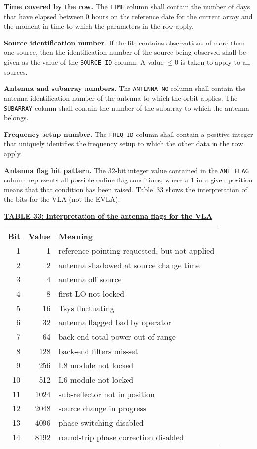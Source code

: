 \documentclass[twoside]{article}
\begin{document}
{\bf Time covered by the row.}  The {\tt TIME} column shall contain
the number of days that have elapsed between 0 hours on the reference
date for the current array and the moment in time to which the
parameters in the row apply.

{\bf Source identification number.} If the file contains observations
of more than one source, then the identification number of the source
being observed shall be given as the value of the {\tt SOURCE ID}
column.  A value $\leq 0$ is taken to apply to all sources.

{\bf Antenna and subarray numbers.}  The {\tt ANTENNA\_NO} column
shall contain the antenna identification number of the antenna to
which the orbit applies.  The {\tt SUBARRAY} column shall contain the
number of the subarray to which the antenna belongs.

{\bf Frequency setup number.} The {\tt FREQ ID} column shall contain a
positive integer that uniquely identifies the frequency setup to which
the other data in the row apply.

{\bf Antenna flag bit pattern.} The 32-bit integer value contained in
the {\tt ANT FLAG} column represents all possible online flag
conditions, where a 1 in a given position means that that condition
has been raised.  Table~33 shows the interpretation of the bits for
the VLA (not the EVLA).

\begin{center}
\underline{\bf{TABLE 33: Interpretation of the antenna flags for the VLA}}\\
\begin{tabular}{rrl}
\noalign{\vspace{2pt}} \label{ta:OF_VLA}
\underline{{\bf Bit\vphantom{y}}} & \underline{\bf{Value\vphantom{y}}} &
    \underline{\bf{Meaning}} \\
\noalign{\vspace{2pt}}
  1 &     1 & reference pointing requested, but not applied \\
  2 &     2 & antenna shadowed at source change time \\
  3 &     4 & antenna off source \\
  4 &     8 & first LO not locked \\
  5 &    16 & Tsys fluctuating \\
  6 &    32 & antenna flagged bad by operator \\
  7 &    64 & back-end total power out of range \\
  8 &   128 & back-end filters mis-set \\
  9 &   256 & L8 module not locked \\
 10 &   512 & L6 module not locked \\
 11 &  1024 & sub-reflector not in position \\
 12 &  2048 & source change in progress \\
 13 &  4096 & phase switching disabled \\
 14 &  8192 & round-trip phase correction disabled
\end{tabular}
\end{center}
\end{document}
